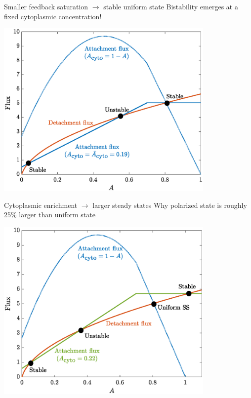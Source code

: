 \documentclass{beamer}
\newcommand{\6}[1]{#1_{\text{6}}}
\newcommand{\3}[1]{#1_{\text{3}}}
\begin{document}
\begin{frame}{Smaller feedback saturation $\rightarrow$ stable uniform state}
Bistability emerges at a fixed cytoplasmic concentration!
\begin{center}
\includegraphics[width=0.8\textwidth]{PAR3DiagramSat.eps}
\end{center}
\end{frame}

\begin{frame}{Cytoplasmic enrichment $\rightarrow$ larger steady states}
Why polarized state is roughly 25\% larger than uniform state
\begin{center}
\includegraphics[width=0.8\textwidth]{PAR3DiagramSatSides.eps}
\end{center}
\end{frame}
\end{document}
